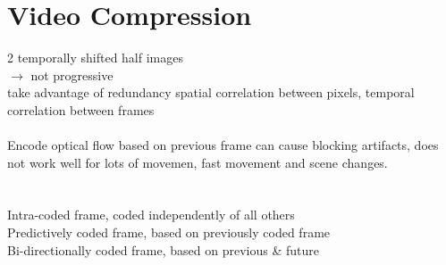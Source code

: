 \section{Video Compression}
 2 temporally shifted half images \\
 $\rightarrow$ not progressive\\
 take advantage of redundancy spatial correlation between pixels, temporal correlation between frames \\
\\
 Encode optical flow based on previous frame can cause blocking artifacts, does not work well for lots of movemen, fast movement and scene changes.\\
\\
\\
 Intra-coded frame, coded independently of all others\\
 Predictively coded frame, based on previously coded frame\\
 Bi-directionally coded frame, based on previous \& future
